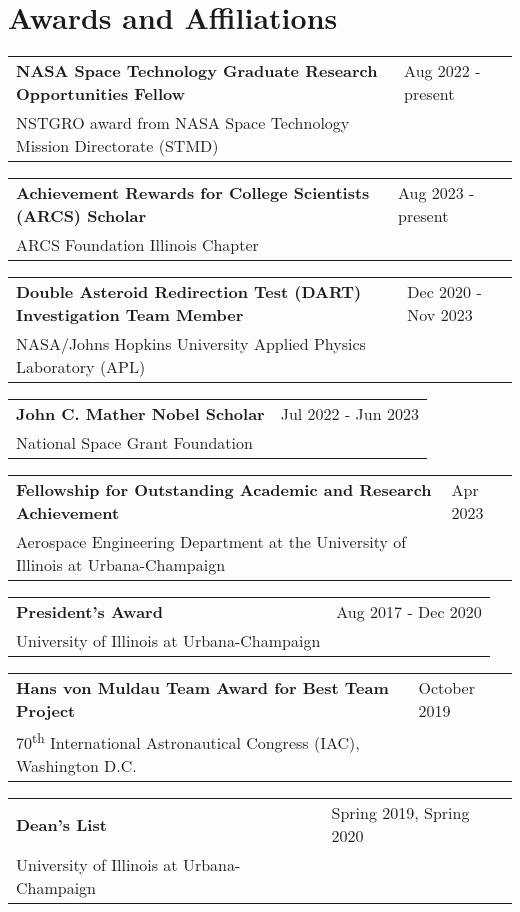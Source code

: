 \documentclass[letterpaper,12pt]{article}
\begin{document}
\section{Awards and Affiliations}
\begin{tabularx}{\linewidth}{@{}l X@{}}
\textbf{NASA Space Technology Graduate Research Opportunities Fellow} & \hfill Aug 2022 - present \\[3.75pt]
NSTGRO award from NASA Space Technology Mission Directorate (STMD) & \hfill \\[3.75pt]
\end{tabularx}
\begin{tabularx}{\linewidth}{@{}l X@{}}
\textbf{Achievement Rewards for College Scientists (ARCS) Scholar} & \hfill Aug 2023 - present \\[3.75pt]
ARCS Foundation Illinois Chapter & \hfill \\[3.75pt]
\end{tabularx}
\begin{tabularx}{\linewidth}{@{}l X@{}}
\textbf{Double Asteroid Redirection Test (DART) Investigation Team Member} & \hfill Dec 2020 - Nov 2023 \\[3.75pt]
NASA/Johns Hopkins University Applied Physics Laboratory (APL) & \hfill \\[3.75pt]
\end{tabularx}
\begin{tabularx}{\linewidth}{@{}l X@{}}
\textbf{John C. Mather Nobel Scholar} & \hfill Jul 2022 - Jun 2023 \\[3.75pt]
National Space Grant Foundation & \hfill \\[3.75pt]
\end{tabularx}
\begin{tabularx}{\linewidth}{@{}l X@{}}
\textbf{Fellowship for Outstanding Academic and Research Achievement} & \hfill Apr 2023 \\[3.75pt]
Aerospace Engineering Department at the University of Illinois at Urbana-Champaign & \hfill \\[3.75pt]
\end{tabularx}
\begin{tabularx}{\linewidth}{@{}l X@{}}
\textbf{President's Award} & \hfill Aug 2017 - Dec 2020 \\[3.75pt]
University of Illinois at Urbana-Champaign & \hfill \\[3.75pt]
\end{tabularx}
\begin{tabularx}{\linewidth}{@{}l X@{}}
\textbf{Hans von Muldau Team Award for Best Team Project} & \hfill October 2019 \\[3.75pt]
70\textsuperscript{th} International Astronautical Congress (IAC), Washington D.C. & \hfill \\[3.75pt]
\end{tabularx}
\begin{tabularx}{\linewidth}{@{}l X@{}}
\textbf{Dean's List} & \hfill Spring 2019, Spring 2020 \\[3.75pt]
University of Illinois at Urbana-Champaign & \hfill \\[3.75pt]
\end{tabularx}
\end{document}
